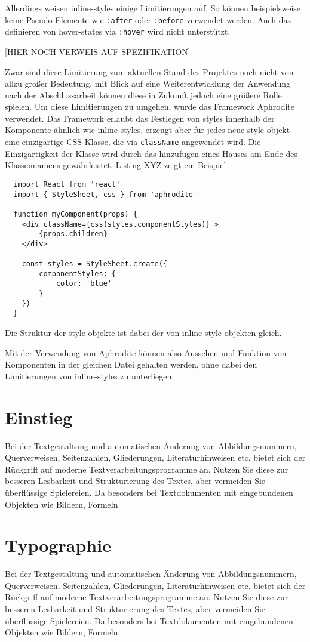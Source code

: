Allerdings weisen inline-styles einige Limitierungen auf. So können beispielsweise keine Pseudo-Elemente wie \verb|:after| oder \verb|:before| verwendet werden. Auch das definieren von hover-states via \verb|:hover| wird nicht unterstützt.

[HIER NOCH VERWEIS AUF SPEZIFIKATION]

Zwar sind diese Limitierung zum aktuellen Stand des Projektes noch nicht von allzu großer Bedeutung, mit Blick auf eine Weiterentwicklung der Anwendung nach der Abschlussarbeit können diese in Zukunft jedoch eine größere Rolle spielen.
Um diese  Limitierungen zu umgehen, wurde das Framework Aphrodite verwendet. Das Framework erlaubt das Festlegen von styles innerhalb der Komponente ähnlich wie inline-styles, erzeugt aber für jedes neue style-objekt eine einzigartige CSS-Klasse, die via \verb|className| angewendet wird. Die Einzigartigkeit der Klasse wird durch das hinzufügen eines Hauses am Ende des Klassennamens gewährleistet.  Listing XYZ zeigt ein Beispiel

\begin{lstlisting}
  import React from 'react'
  import { StyleSheet, css } from 'aphrodite'

  function myComponent(props) {
  	<div className={css(styles.componentStyles)} >
  		{props.children}
  	</div>

  	const styles = StyleSheet.create({
  		componentStyles: {
  			color: 'blue'
  		}
  	})
  }
\end{lstlisting}

Die Struktur der style-objekte ist dabei der von inline-style-objekten gleich.

Mit der Verwendung von Aphrodite können also Aussehen und Funktion von Komponenten in der gleichen Datei gehalten werden, ohne dabei den Limitierungen von inline-styles zu unterliegen.

\section{Einstieg}
Bei der Textgestaltung und automatischen Änderung von Abbildungsnummern, Querverweisen,
Seitenzahlen, Gliederungen, Literaturhinweisen etc. bietet sich der Rückgriff
auf moderne Textverarbeitungsprogramme an. Nutzen Sie diese zur besseren Lesbarkeit
und Strukturierung des Textes, aber vermeiden Sie überflüssige Spielereien. Da
besonders bei Textdokumenten mit eingebundenen Objekten wie Bildern, Formeln

\section{Typographie}
Bei der Textgestaltung und automatischen Änderung von Abbildungsnummern, Querverweisen,
Seitenzahlen, Gliederungen, Literaturhinweisen etc. bietet sich der Rückgriff
auf moderne Textverarbeitungsprogramme an. Nutzen Sie diese zur besseren Lesbarkeit
und Strukturierung des Textes, aber vermeiden Sie überflüssige Spielereien. Da
besonders bei Textdokumenten mit eingebundenen Objekten wie Bildern, Formeln

